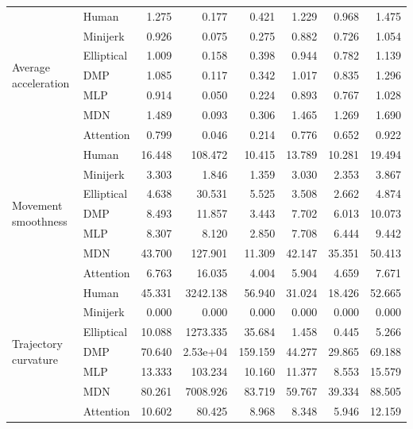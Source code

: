 \documentclass[journal]{IEEEtran}
\begin{document}
\begin{table}[th]
\begin{tabular}{llrrrrrr}
\midrule
\multirow{7}{*}{Average acceleration}
 & Human & 1.275 & 0.177 & 0.421 & 1.229 & 0.968 & 1.475 \\
 & Minijerk & 0.926 & 0.075 & 0.275 & 0.882 & 0.726 & 1.054 \\
 & Elliptical & 1.009 & 0.158 & 0.398 & 0.944 & 0.782 & 1.139 \\
 & DMP & 1.085 & 0.117 & 0.342 & 1.017 & 0.835 & 1.296 \\
 & MLP & 0.914 & 0.050 & 0.224 & 0.893 & 0.767 & 1.028 \\
 & MDN & 1.489 & 0.093 & 0.306 & 1.465 & 1.269 & 1.690 \\
 & Attention & 0.799 & 0.046 & 0.214 & 0.776 & 0.652 & 0.922 \\
\midrule
\multirow{7}{*}{Movement smoothness}
 & Human & 16.448 & 108.472 & 10.415 & 13.789 & 10.281 & 19.494 \\
 & Minijerk & 3.303 & 1.846 & 1.359 & 3.030 & 2.353 & 3.867 \\
 & Elliptical & 4.638 & 30.531 & 5.525 & 3.508 & 2.662 & 4.874 \\
 & DMP & 8.493 & 11.857 & 3.443 & 7.702 & 6.013 & 10.073 \\
 & MLP & 8.307 & 8.120 & 2.850 & 7.708 & 6.444 & 9.442 \\
 & MDN & 43.700 & 127.901 & 11.309 & 42.147 & 35.351 & 50.413 \\
 & Attention & 6.763 & 16.035 & 4.004 & 5.904 & 4.659 & 7.671 \\
\midrule
\multirow{7}{*}{Trajectory curvature}
 & Human & 45.331 & 3242.138 & 56.940 & 31.024 & 18.426 & 52.665 \\
 & Minijerk & 0.000 & 0.000 & 0.000 & 0.000 & 0.000 & 0.000 \\
 & Elliptical & 10.088 & 1273.335 & 35.684 & 1.458 & 0.445 & 5.266 \\
 & DMP & 70.640 & 2.53e+04 & 159.159 & 44.277 & 29.865 & 69.188 \\
 & MLP & 13.333 & 103.234 & 10.160 & 11.377 & 8.553 & 15.579 \\
 & MDN & 80.261 & 7008.926 & 83.719 & 59.767 & 39.334 & 88.505 \\
 & Attention & 10.602 & 80.425 & 8.968 & 8.348 & 5.946 & 12.159 \\
\bottomrule
\end{tabular}
\end{table}
\end{document}
